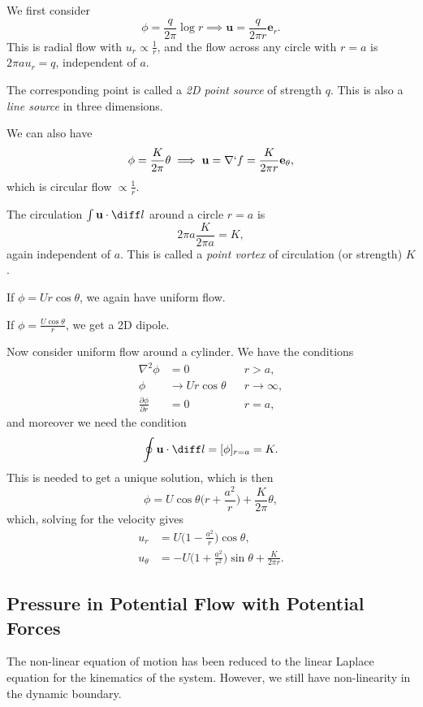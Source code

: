 \documentclass[12pt]{article}
\begin{document}

We first consider
\[
\phi = \frac{q}{2 \pi} \log r \implies \mathbf{u} = \frac{q}{2 \pi r}\mathbf{e}_r.
\]
This is radial flow with $u_r \propto \frac{1}{r}$, and the flow across any circle with $r = a$ is $2 \pi a u_r = q$, independent of $a$.

The corresponding point is called a \emph{2D point source} of strength $q$. This is also a \emph{line source} in three dimensions.

We can also have
\[
\phi = \frac{K}{2 \pi}\theta \implies \mathbf{u} = \nabla `f = \frac{K}{2 \pi r} \mathbf{e}_{\theta},
\]
which is circular flow $\propto \frac{1}{r}$.

The circulation $\int \mathbf{u} \cdot \diff l$ around a circle $r = a$ is
\[
2 \pi a \frac{K}{2 \pi a} = K,
\]
again independent of $a$. This is called a \emph{point vortex} of circulation (or strength) $K$.

If $\phi = U r \cos \theta$, we again have uniform flow.

If $\phi = \frac{U \cos \theta}{r}$, we get a 2D dipole.

Now consider uniform flow around a cylinder. We have the conditions
\begin{align*}
	\nabla^2 \phi &= 0 & &r>a,\\
	\phi &\to U r \cos \theta & &r \to \infty,\\
	\frac{\partial \phi}{\partial r} &= 0 & &r=a,
\end{align*}
and moreover we need the condition
\[
	\oint \mathbf{u} \cdot \diff l = [\phi]_{r = a} = K.
\]
This is needed to get a unique solution, which is then
\[
\phi = U \cos \theta \biggl( r + \frac{a^2}{r} \biggr) + \frac{K}{2\pi}\theta,
\]
which, solving for the velocity gives
\begin{align*}
	u_r &= U \biggl( 1 - \frac{a^2}{r} \biggr) \cos \theta, \\
	u_{\theta} &= - U \biggl( 1 + \frac{a^2}{r^2} \biggr) \sin \theta + \frac{K}{2 \pi r}.
\end{align*}

\subsection{Pressure in Potential Flow with Potential Forces}
\label{sub:pressure_in_potential_flow_with_potential_forces}

The non-linear equation of motion has been reduced to the linear Laplace equation for the kinematics of the system. However, we still have non-linearity in the dynamic boundary.
\end{document}
